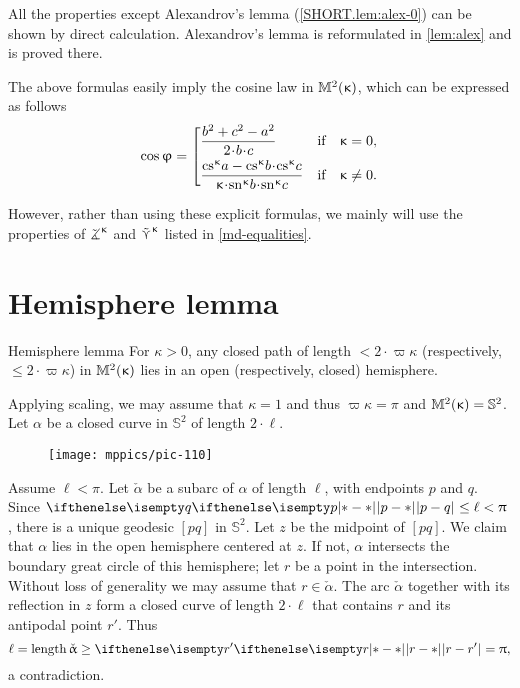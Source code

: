 All the properties except Alexandrov's lemma (\ref{SHORT.lem:alex-0}) can be shown by direct calculation. Alexandrov's lemma is reformulated in \ref{lem:alex} and is proved there.




The above formulas easily imply  the cosine law in $\mathbb{M}_{{}}^{2}({\upkappa})$, which can be expressed as follows
\[\cos\phi
=\left[\begin{aligned}
&\frac{b^2+c^2-a^2}{2\cdot b\cdot c}
&\text{if}&\quad \kappa=0,
\\
&\frac{\cs\kappa a-\cs\kappa b\cdot\cs\kappa c}{\kappa\cdot\sn\kappa b\cdot\sn\kappa c}
&\text{if}&\quad \kappa\not=0.
\end{aligned}\right.\]

However, rather than using these explicit formulas,  we mainly will use
the properties of $\tangle\mc\kappa$ and $\mathop{\tilde\curlyvee}\nolimits^{\upkappa}$ listed in \ref{md-equalities}.

\section{Hemisphere lemma}\label{curves-in-model}

\begin{thm}{Hemisphere lemma}
\label{lem:hemisphere}
For $\kappa>0$, any closed path of length $<2\cdot \varpi\kappa$ (respectively, $\le2\cdot \varpi\kappa$) in $\mathbb{M}_{{}}^{2}({\upkappa})$ lies in an open (respectively, closed) hemisphere. 
\end{thm}

 Applying scaling, we may assume that $\kappa=1$ and thus $\varpi\kappa=\pi$ and $\mathbb{M}_{{}}^{2}({\upkappa})=\mathbb{S}^2$.
Let $\alpha$ be a closed curve in $\mathbb{S}^2$ of length $2\cdot\ell$.



\begin{wrapfigure}{o}{35 mm}
\vskip-0mm
\centering
\texttt{[image: mppics/pic-110]}
\end{wrapfigure}

Assume $\ell<\pi$.
Let $\check\alpha$ be a subarc of $\alpha$ of length $\ell$, with endpoints $p$ and $q$. 
Since $\dist{p}{q}{}\le\ell<\pi$, there is a unique geodesic $[pq]$ in $\mathbb{S}^2$.  
Let $z$ be the midpoint of  $[pq]$.  
We claim that $\alpha$ lies in the open hemisphere centered at $z$.  
If not, $\alpha$ intersects the boundary  great circle of this hemisphere; let $r$ be a point in the intersection.
Without loss of generality we may assume that $r\in\check\alpha$. 
The arc $\check\alpha$ together with its reflection in $z$ form a closed curve of length $2\cdot \ell$ that contains $r$ and its antipodal point $r'$.
Thus 
\[\ell=\length \check\alpha\ge \dist{r}{r'}{}=\pi,\] 
a contradiction.

